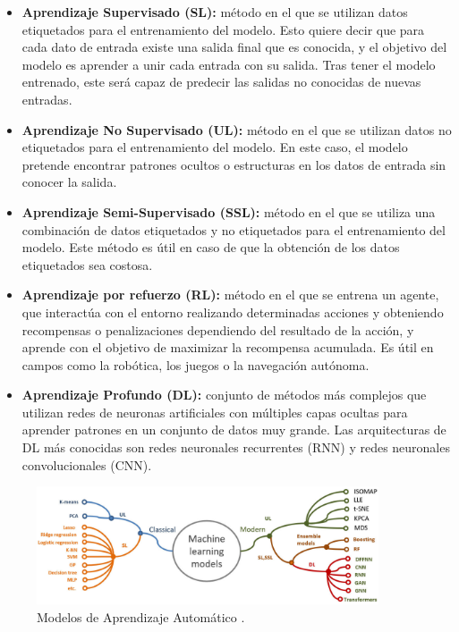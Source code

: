 \documentclass[12pt]{report} %
\begin{document}
\begin{itemize}

    \item \textbf{Aprendizaje Supervisado (SL):} método en el que se utilizan datos etiquetados para el entrenamiento del modelo. Esto quiere decir que para cada dato de entrada existe una salida final que es conocida, y el objetivo del modelo es aprender a unir cada entrada con su salida. Tras tener el modelo entrenado, este será capaz de predecir las salidas no conocidas de nuevas entradas.
    \item \textbf{Aprendizaje No Supervisado (UL):} método en el que se utilizan datos no etiquetados para el entrenamiento del modelo. En este caso, el modelo pretende encontrar patrones ocultos o estructuras en los datos de entrada sin conocer la salida.
    \item \textbf{Aprendizaje Semi-Supervisado (SSL):} método en el que se utiliza una combinación de datos etiquetados y no etiquetados para el entrenamiento del modelo. Este método es útil en caso de que la obtención de los datos etiquetados sea costosa.
    \item \textbf{Aprendizaje por refuerzo (RL):} método en el que se entrena un agente, que interactúa con el entorno realizando determinadas acciones y obteniendo recompensas o penalizaciones dependiendo del resultado de la acción, y aprende con el objetivo de maximizar la recompensa acumulada. Es útil en campos como la robótica, los juegos o la navegación autónoma.
    \item \textbf{Aprendizaje Profundo (DL):} conjunto de métodos más complejos que utilizan redes de neuronas artificiales con múltiples capas ocultas para aprender patrones en un conjunto de datos muy grande. Las arquitecturas de DL más conocidas son redes neuronales recurrentes (RNN) y redes neuronales convolucionales (CNN).

\end{itemize}

\begin{figure}[h]
	\centering
	\includegraphics[width=0.9\textwidth]{modelsML.png}
	\caption{Modelos de Aprendizaje Automático \cite{artInt}.}
	\label{fig:imagen24}
\end{figure}
\end{document}
